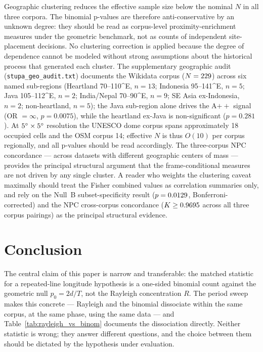 \documentclass[12pt,a4paper]{article}
\newcommand{\degr}{\ifmmode^\circ\else\textdegree{}\fi}
\begin{document}
Geographic clustering reduces the effective sample size below the
nominal $N$ in all three corpora. The binomial p-values are therefore
anti-conservative by an unknown degree: they should be read as
corpus-level proximity-enrichment measures under the geometric
benchmark, not as counts of independent site-placement decisions. No
clustering correction is applied because the degree of dependence
cannot be modeled without strong assumptions about the historical
process that generated each cluster. The supplementary geographic audit ({\tt stupa\_geo\_audit.txt})
documents the Wikidata corpus ($N = 229{}$) across six named
sub-regions (Heartland 70--110\degr{}E, $n=13$; Indonesia
95--141\degr{}E, $n=5$; Java 105--112\degr{}E, $n=2$;
India/Nepal 70--90\degr{}E, $n=9$; SE Asia ex-Indonesia, $n=2$;
non-heartland, $n=5$); the Java sub-region alone drives the
A$++$ signal (OR $= \infty$, $p = 0.0075$), while the heartland
ex-Java is non-significant ($p = 0.281$). At $5\degr \times 5\degr$
resolution the UNESCO dome corpus spans approximately 18 occupied
cells and the OSM corpus 14; effective $N$ is thus $O(10)$ per
corpus regionally, and all p-values should be read accordingly. The three-corpus NPC concordance --- across datasets with
different geographic centers of mass --- provides the principal
structural argument that the frame-conditional measures are not driven
by any single cluster. A reader who weights the clustering caveat
maximally should treat the Fisher combined values as correlation
summaries only, and rely on the Null~B subset-specificity result
($p = 0.0129{}$, Bonferroni-corrected) and the
NPC cross-corpus concordance ($K \geq 0.9695{}$ across all
three corpus pairings) as the principal structural evidence.

\section{Conclusion}
\label{sec:conclusion}

The central claim of this paper is narrow and transferable: the matched
statistic for a repeated-line longitude hypothesis is a one-sided
binomial count against the geometric null $p_0 = 2d/T$, not the
Rayleigh concentration $R$. The period sweep makes this concrete ---
Rayleigh and the binomial dissociate within the same corpus, at the
same phase, using the same data --- and Table~\ref{tab:rayleigh_vs_binom}
documents the dissociation directly. Neither statistic is wrong; they
answer different questions, and the choice between them should be
dictated by the hypothesis under evaluation.
\end{document}

